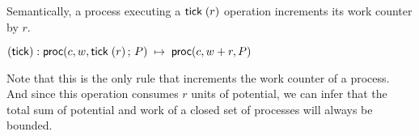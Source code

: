 Semantically, a process executing a $\mathsf{tick} \; (r)$ operation increments its work counter by $r$.
\begin{tabbing}
  $(\mathsf{tick}) : \mathsf{proc}(c, w, \mathsf{tick} \; (r) \, ; \, P) \; \mapsto \; \mathsf{proc}(c, w+r, P)$
\end{tabbing}
Note that this is the only rule that increments the work counter of a process.
And since this operation consumes $r$ units of potential, we can infer
that the total sum of potential and work of a closed set of processes will always be bounded.


